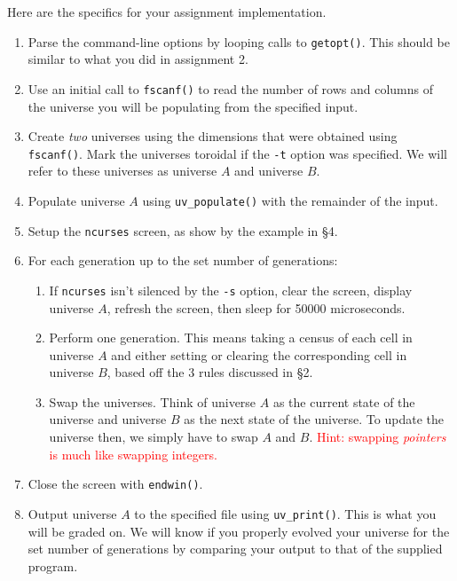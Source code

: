 \documentclass[11pt]{article}
\begin{document}
Here are the specifics for your assignment implementation.

\begin{enumerate}
  \item Parse the command-line options by looping calls to \texttt{getopt()}.
    This should be similar to what you did in assignment 2.
  \item Use an initial call to \texttt{fscanf()} to read the number of rows and columns of
    the universe you will be populating from the specified input.
  \item Create \emph{two} universes using the dimensions that were obtained using \texttt{fscanf()}. Mark
    the universes toroidal if the \texttt{-t} option was specified. We will
    refer to these universes as universe $A$ and universe $B$.
  \item Populate universe $A$ using \texttt{uv\_populate()} with the remainder of the
    input.
  \item Setup the \texttt{ncurses} screen, as show by the example in \S 4.
  \item For each generation up to the set number of generations:
    \begin{enumerate}
      \item If \texttt{ncurses} isn't silenced by the \texttt{-s} option, clear
        the screen, display universe $A$, refresh the screen, then sleep for 50000
        microseconds.
      \item Perform one generation. This means taking a census of each cell in
        universe $A$ and either setting or clearing the corresponding cell in
        universe $B$, based off the 3 rules discussed in \S 2.
      \item Swap the universes. Think of universe $A$ as the current state of the
        universe and universe $B$ as the next state of the universe. To update the
        universe then, we simply have to swap $A$ and $B$. \textcolor{red}{Hint:
        swapping \emph{pointers} is much like swapping integers.}
    \end{enumerate}
  \item Close the screen with \texttt{endwin()}.
  \item Output universe $A$ to the specified file using \texttt{uv\_print()}.
    This is what you will be graded on. We will know if you properly
    evolved your universe for the set number of generations by comparing your output
    to that of the supplied program.
\end{enumerate}
\end{document}
